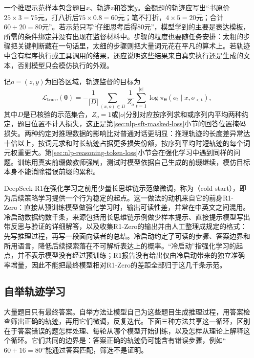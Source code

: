 一个推理示范样本包含题目$x$、轨迹$z$和答案$y$。金额题的轨迹应写出“书原价$25\times3=75$元，打八折后$75\times0.8=60$元；笔不打折，$4\times5=20$元；合计$60+20=80$元”。若示范只写“仔细思考后得80元”，模型学到的主要是表达模板，所需的条件绑定并没有出现在监督材料中。步骤的粒度也要随任务安排：太粗的步骤把关键判断藏在一句话里，太细的步骤则把大量词元花在平凡的算术上。若轨迹中含有程序执行或工具调用的结果，还应说明这些结果来自真实执行还是生成的文本，否则模型只会模仿执行的外观。

记$o=(z,y)$为回答区域，轨迹监督的目标为
\begin{equation}
  \mathcal L_{\mathrm{trace}}(\bm\theta)
  =-\frac1{|D|}\sum_{(x,o)\in D}\frac1{Z_o}
    \sum_{t=1}^{|o|}\log \pi_{\bm\theta}(o_t\mid x,o_{<t}),
  \label{eq:nlp-reasoning-trace-sft}
\end{equation}
其中$D$是已核验的示范集合，$Z_o=1$或$|o|$分别对应按序列求和或序列内平均两种约定，题目位置不计入损失，这正是第\ref{sec:nlp-sft-masked-loss}小节的回答位置掩码损失。两种约定对推理数据的影响比对普通对话更明显：推理轨迹的长度差异常达十倍以上，按词元求和时长轨迹占据更多损失份额，按序列平均时短轨迹的每个词元权重更大。第\ref{sec:nlp-reasoning-token-loss}小节会在强化学习中遇到同样的问题。训练用真实前缀做教师强制，测试时模型依据自己生成的前缀继续，模仿目标本身不能消除错误前缀的累积。

DeepSeek-R1在强化学习之前用少量长思维链示范做微调，称为（cold start），即为后续策略学习提供一个行为稳定的起点。这一做法的动机来自它的前身R1-Zero：直接从预训练模型做强化学习时，输出可读性差，并常在中英文之间混用。冷启动数据约数千条，来源包括用长思维链示例做少样本提示、直接提示模型写出带反思与验证的详细解答，以及收集R1-Zero的输出并由人工整理成规定的格式：先写推理过程，再写一段面向读者的总结。冷启动约定了可读的步骤、答案边界和所用语言，降低后续探索落在不可解析表达上的概率。“冷启动”指强化学习的起点，并不表示模型没有经过预训练；R1报告没有给出仅由冷启动带来的独立准确率增量，因此不能把最终模型相对R1-Zero的差距全部归于这几千条示范。

\subsection{自举轨迹学习}
\label{sec:nlp-reasoning-star}

大量题目只有最终答案。自举方法让模型自己为这些题目生成推理过程，用答案检查筛出正确的轨迹，再用它们微调，反复迭代。下面三种方法共享这一循环，区别在于答案错误的题怎样处理、每轮从哪个模型开始训练，以及怎样从理论上解释这个循环。它们共同的边界是：答案正确的轨迹仍可能含有错误步骤，例如“$60+16=80$”能通过答案匹配，筛选不是证明。

